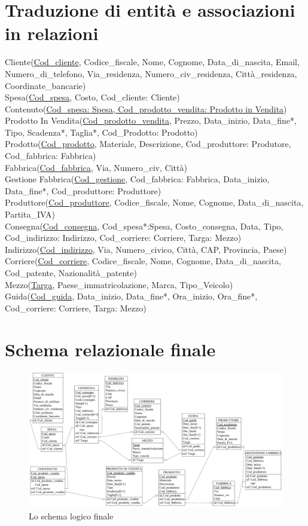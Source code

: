 \documentclass[a4paper,12pt]{report}
\begin{document}
\section{Traduzione di entità e associazioni in relazioni}
Cliente(\underline{Cod\_cliente}, Codice\_fiscale, Nome, Cognome, Data\_di\_nascita, Email, Numero\_di\_telefono, Via\_residenza, Numero\_civ\_residenza, Città\_residenza, Coordinate\_bancarie)\\
Spesa(\underline{Cod\_spesa}, Costo, Cod\_cliente: Cliente)\\
Contenuto(\underline{Cod\_spesa: Spesa, Cod\_prodotto\_vendita: Prodotto in Vendita})\\
Prodotto In Vendita(\underline{Cod\_prodotto\_vendita}, Prezzo, Data\_inizio, Data\_fine*, Tipo, Scadenza*, Taglia*, Cod\_Prodotto: Prodotto)\\
Prodotto(\underline{Cod\_prodotto}, Materiale, Descrizione, Cod\_produttore: Produtore, Cod\_fabbrica: Fabbrica)\\
Fabbrica(\underline{Cod\_fabbrica}, Via, Numero\_civ, Città)\\
Gestione Fabbrica(\underline{Cod\_gestione}, Cod\_fabbrica: Fabbrica, Data\_inizio, Data\_fine*, Cod\_produttore: Produttore)\\
Produttore(\underline{Cod\_produttore}, Codice\_fiscale, Nome, Cognome, Data\_di\_nascita, Partita\_IVA)\\
Consegna(\underline{Cod\_consegna}, Cod\_spesa*:Spesa, Costo\_consegna, Data, Tipo, Cod\_indirizzo: Indirizzo, Cod\_corriere: Corriere, Targa: Mezzo)\\
Indirizzo(\underline{Cod\_indirizzo}, Via, Numero\_civico, Città, CAP, Provincia, Paese)\\
Corriere(\underline{Cod\_corriere}, Codice\_fiscale, Nome, Cognome, Data\_di\_nascita, Cod\_patente, Nazionalità\_patente)\\
Mezzo(\underline{Targa}, Paese\_immatricolazione, Marca, Tipo\_Veicolo)\\
Guida(\underline{Cod\_guida}, Data\_inizio, Data\_fine*, Ora\_inizio, Ora\_fine*, Cod\_corriere: Corriere, Targa: Mezzo)\\
\section{Schema relazionale finale}
\begin{figure}[H]
	\centering{}
	\includegraphics[width=\textwidth]{img/SchemaLogico-fin.pdf}
	\caption{Lo schema logico finale}
\end{figure}
\end{document}
